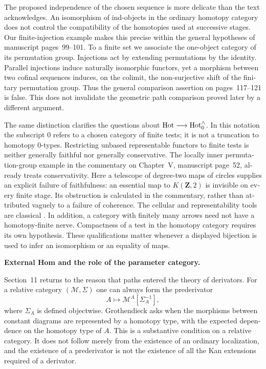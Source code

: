 \begin{otherlanguage}{english}
The proposed independence of the chosen sequence is more delicate than the
text acknowledges.  An isomorphism of ind-objects in the ordinary homotopy
category does not control the compatibility of the homotopies used at
successive stages.  Our finite-injection example makes this precise within the
general hypotheses of manuscript pages~99--101.  To a finite set we associate
the one-object category of its permutation group.  Injections act by extending
permutations by the identity.  Parallel injections induce naturally isomorphic
functors, yet a morphism between two cofinal sequences induces, on the colimit,
the non-surjective shift of the finitary permutation group.  Thus the general
comparison assertion on pages~117--121 is false.  This does not invalidate the
geometric path comparison proved later by a different argument.

The same distinction clarifies the questions about
$\mathrm{Hot}\longrightarrow\mathrm{Hot}_0^{\wedge}$.  In this notation the subscript $0$
refers to a chosen category of finite tests; it is not a truncation to
homotopy $0$-types.  Restricting unbased representable functors to finite tests
is neither generally faithful nor generally conservative.  The locally inner
permutation-group example in the commentary on Chapter~V, manuscript page~52,
already treats conservativity.  Here a telescope of degree-two maps of circles supplies an
explicit failure of faithfulness: an essential map to $K(\mathbf Z,2)$ is
invisible on every finite stage.  Its obstruction is calculated in the
commentary, rather than attributed vaguely to a failure of coherence.  The
cellular and representability tools are classical
\citep[\S3F and Theorem~4.57]{Hatcher2002}.  In addition, a category with
finitely many arrows need not have a homotopy-finite nerve.  Compactness of a
test in the homotopy category requires its own hypothesis.  These qualifications
matter whenever a displayed bijection is used to infer an isomorphism or an
equality of maps.

\medskip\noindent\textbf{External Hom and the role of the parameter category.}

Section~11 returns to the reason that paths entered the theory of derivators.
For a relative category $(\mathcal M,\Sigma)$ one can always form the
prederivator
\[
 A\longmapsto\mathcal M^A[\Sigma_A^{-1}],
\]
where $\Sigma_A$ is defined objectwise.  Grothendieck asks when the morphisms
between constant diagrams are represented by a homotopy type, with the expected
dependence on the homotopy type of $A$.  This is a substantive condition on a
relative category.  It does not follow merely from the existence of an
ordinary localization, and the existence of a prederivator is not the
existence of all the Kan extensions required of a derivator.


\end{otherlanguage}
